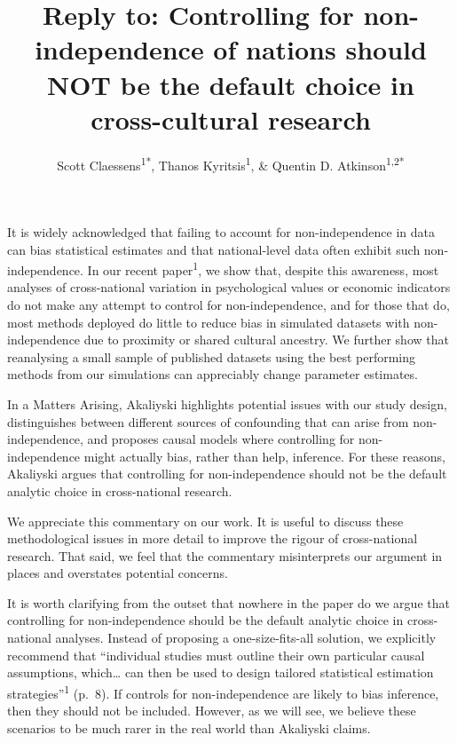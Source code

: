 \documentclass[
  man, donotrepeattitle,floatsintext]{apa6}
\title{Reply to: Controlling for non-independence of nations should NOT be the default choice in cross-cultural research}
\author{Scott Claessens\textsuperscript{1*}, Thanos Kyritsis\textsuperscript{1}, \& Quentin D. Atkinson\textsuperscript{1,2*}}
\date{}
\affiliation{\vspace{0.5cm}\textsuperscript{1} \footnotesize School of Psychology, University of Auckland, Auckland, New Zealand\\\textsuperscript{2} \footnotesize School of Anthropology and Museum Ethnography, University of Oxford, Oxford, United Kingdom \newline *email: \href{mailto:scott.claessens@gmail.com}{\nolinkurl{scott.claessens@gmail.com}}; \href{mailto:q.atkinson@auckland.ac.nz}{\nolinkurl{q.atkinson@auckland.ac.nz}}}
\begin{document}
\maketitle

\linenumbers

It is widely acknowledged that failing to account for non-independence in data
can bias statistical estimates and that national-level data often exhibit such
non-independence. In our recent paper\textsuperscript{1}, we show that, despite
this awareness, most analyses of cross-national variation in psychological
values or economic indicators do not make any attempt to control for
non-independence, and for those that do, most methods deployed do little to
reduce bias in simulated datasets with non-independence due to proximity or
shared cultural ancestry. We further show that reanalysing a small sample of
published datasets using the best performing methods from our simulations can
appreciably change parameter estimates.

In a Matters Arising, Akaliyski highlights potential issues with our study
design, distinguishes between different sources of confounding that can arise
from non-independence, and proposes causal models where controlling for
non-independence might actually bias, rather than help, inference. For these
reasons, Akaliyski argues that controlling for non-independence
should not be the default analytic choice in cross-national research.

We appreciate this commentary on our work. It is useful to discuss these
methodological issues in more detail to improve the rigour of cross-national
research. That said, we feel that the commentary misinterprets our
argument in places and overstates potential concerns.

It is worth clarifying from the outset that nowhere in the paper do we argue
that controlling for non-independence should be the default analytic choice
in cross-national analyses. Instead of proposing a one-size-fits-all
solution, we explicitly recommend that ``individual studies must outline
their own particular causal assumptions, which\ldots{} can then be used to design
tailored statistical estimation strategies''\textsuperscript{1} (p.~8). If controls
for non-independence are likely to bias inference, then they should not be
included. However, as we will see, we believe these scenarios to be much
rarer in the real world than Akaliyski claims.
\end{document}
